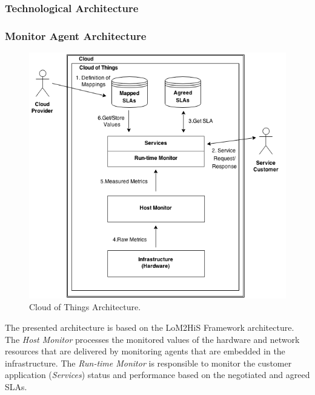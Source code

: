 \subsubsection{Technological Architecture}
\label{subs:technological_architecture}
\subsubsection{Monitor Agent Architecture}
\label{subs:monitoring_srchitecture}
\vspace{1in}
\begin{figure}[h!]
  \centering
  \includegraphics[width=.8\textwidth]{./images/cloud-of-things-architecture}
  \caption{Cloud of Things Architecture.}
  \label{fig:cloud_of_things_architecture}
\end{figure}
The presented architecture is based on the LoM2HiS Framework \cite{emeakaroha2010low} architecture. The
\textit{Host Monitor} processes the monitored values of the hardware and network resources that are delivered
by monitoring agents that are embedded in the infrastructure. The \textit{Run-time Monitor} is responsible to
monitor the customer application (\textit{Services}) status and performance based on the negotiated
and agreed SLAs.\\

